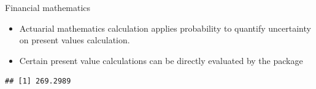 \begin{frame}[fragile]

\begin{block}{Financial mathematics}

\begin{itemize}[<+->]
\itemsep1pt\parskip0pt
\item
  Actuarial mathematics calculation applies probability to quantify
  uncertainty on present values calculation.
\item
  Certain present value calculations can be directly evaluated by the
  package
\end{itemize}

\begin{Shaded}
\begin{Highlighting}[]
\StringTok{ }\NormalTok{(-}\NormalTok{,}\NormalTok{,}\NormalTok{,}\NormalTok{)}
\StringTok{ }\NormalTok{(}\NormalTok{,}\NormalTok{,}\NormalTok{,}\NormalTok{)}
\NormalTok{(}
             \NormalTok{)}
\end{Highlighting}
\end{Shaded}

\begin{verbatim}
## [1] 269.2989
\end{verbatim}

\end{block}

\end{frame}

